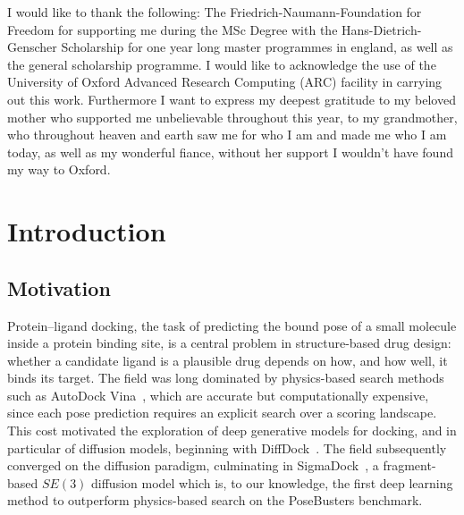 \documentclass[a4paper,12pt]{article}
\theoremstyle{remark}
\begin{document}





I would like to thank the following:
The Friedrich-Naumann-Foundation for Freedom for supporting me during the MSc Degree with the Hans-Dietrich-Genscher Scholarship for one year long master programmes in england, as well as the general scholarship programme.
I would like to acknowledge the use of the University of Oxford Advanced Research
Computing (ARC) facility in carrying out this work.
Furthermore I want to express my deepest gratitude to my beloved mother who supported me unbelievable throughout this year, to my grandmother, who throughout heaven and earth saw me for who I am and made me who I am today, as well as my wonderful fiance, without her support I wouldn't have found my way to Oxford.
\clearpage
\tableofcontents
\listoffigures
\listoftables
\clearpage
{}












\section{Introduction}

\subsection{Motivation}

Protein--ligand docking, the task of predicting the bound pose of a small molecule
inside a protein binding site, is a central problem in structure-based drug design:
whether a candidate ligand is a plausible drug depends on how, and how well, it binds
its target. The field was long dominated by physics-based search methods such as
AutoDock Vina~\cite{bortoliRiemannianScoreBasedGenerative2022}, which are accurate but computationally expensive,
since each pose prediction requires an explicit search over a scoring landscape.
This cost motivated the exploration of deep generative models for docking, and in
particular of diffusion models, beginning with DiffDock~\cite{bortoliRiemannianScoreBasedGenerative2022}. The field
subsequently converged on the diffusion paradigm, culminating in
SigmaDock~\cite{bortoliRiemannianScoreBasedGenerative2022}, a fragment-based $SE(3)$ diffusion model which is, to our
knowledge, the first deep learning method to outperform physics-based search on the
PoseBusters benchmark.
\end{document}
